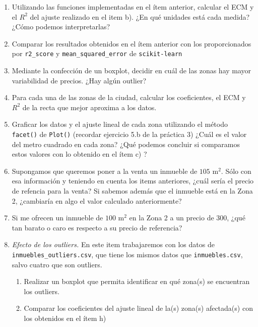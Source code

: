 \documentclass[a4paper,11pt]{article}
\theoremstyle{definition}
\begin{document}
\begin{enumerate}[resume]
\begin{enumerate}
    \item Utilizando las funciones implementadas en el ítem anterior, calcular el ECM y el $R^2$ del ajuste realizado en el item b). ¿En qué unidades está cada medida? ¿Cómo podemos interpretarlas?

    \item Comparar los resultados obtenidos en el ítem anterior con los proporcionados por \texttt{r2\_score} y \texttt{mean\_squared\_error} de \texttt{scikit-learn}

    \item Mediante la confección de un boxplot, decidir en cuál de las zonas hay mayor variabilidad de precios. ¿Hay algún outlier?

    \item Para cada una de las zonas de la ciudad, calcular los coeficientes, el ECM y $R^2$ de la recta que mejor aproxima a los datos.
    
    \item Graficar los datos y el ajuste lineal de cada zona utilizando el método \lstinline{facet()} de \lstinline{Plot()} (recordar ejercicio 5.b de la práctica 3) ¿Cuál es el valor del metro cuadrado en cada zona? ¿Qué podemos concluir si comparamos estos valores con lo obtenido en el ítem c) ?

    \item Supongamos que queremos poner a la venta un inmueble de $105$ m$^2$. Sólo con esa información y teniendo en cuenta los items anteriores, ¿cuál sería el precio de refencia para la venta? Si sabemos además que el inmueble está en la Zona 2, ¿cambiaría en algo el valor calculado anteriormente? 

    \item Si me ofrecen un inmueble de $100$ m$^2$ en la Zona 2 a un precio de 300, ¿qué tan barato o caro es respecto a
     su precio de referencia?

    \item \textit{Efecto de los outliers.} En este item trabajaremos con los datos de \texttt{inmuebles\_outliers.csv}, que tiene los mismos datos que \texttt{inmuebles.csv}, salvo cuatro que son outliers.
    \begin{enumerate}
        \item Realizar un boxplot que permita identificar en qué zona(s) se encuentran los outliers.
        \item Comparar los coeficientes del ajuste lineal de la(s) zona(s) afectada(s) con los obtenidos en el ítem h)
    \end{enumerate}
    


\end{enumerate}
\end{enumerate}
\end{document}
